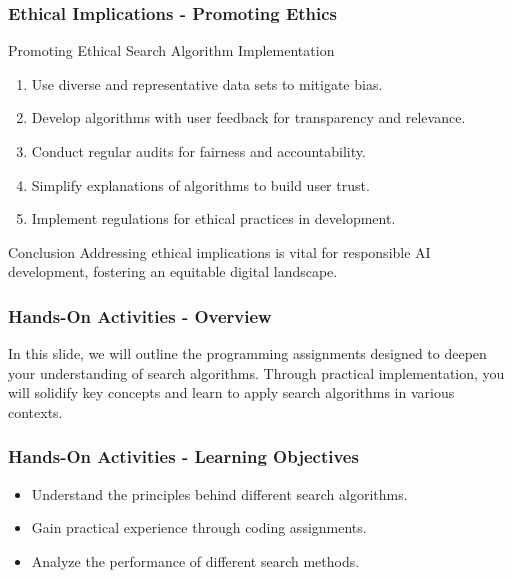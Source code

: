 \documentclass[aspectratio=169]{beamer}
\begin{document}
\begin{frame}[fragile]
  \frametitle{Ethical Implications - Promoting Ethics}
  \begin{block}{Promoting Ethical Search Algorithm Implementation}
    \begin{enumerate}
      \item Use diverse and representative data sets to mitigate bias.
      \item Develop algorithms with user feedback for transparency and relevance.
      \item Conduct regular audits for fairness and accountability.
      \item Simplify explanations of algorithms to build user trust.
      \item Implement regulations for ethical practices in development.
    \end{enumerate}
  \end{block}

  \begin{block}{Conclusion}
    Addressing ethical implications is vital for responsible AI development, fostering an equitable digital landscape.
  \end{block}
\end{frame}

\begin{frame}[fragile]
    \frametitle{Hands-On Activities - Overview}
    In this slide, we will outline the programming assignments designed to deepen your understanding of search algorithms. 
    Through practical implementation, you will solidify key concepts and learn to apply search algorithms in various contexts.
\end{frame}

\begin{frame}[fragile]
    \frametitle{Hands-On Activities - Learning Objectives}
    \begin{itemize}
        \item Understand the principles behind different search algorithms.
        \item Gain practical experience through coding assignments.
        \item Analyze the performance of different search methods.
    \end{itemize}
\end{frame}
\end{document}
